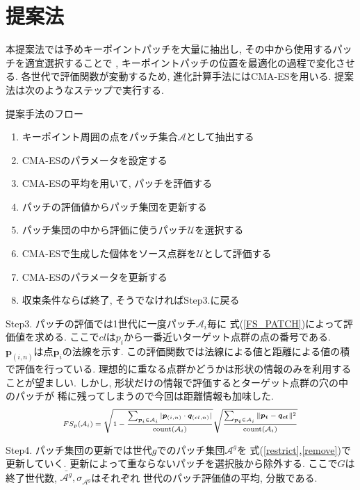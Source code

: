 \documentclass[twocolumn, 9pt, a4j, dvipdfmx]{jsarticle}
\begin{document}
\section{提案法}
本提案法では予めキーポイントパッチを大量に抽出し, 
その中から使用するパッチを適宜選択することで , 
キーポイントパッチの位置を最適化の過程で変化させる.
各世代で評価関数が変動するため, 進化計算手法にはCMA-ES\cite{CMA-ES}を用いる. 
提案法は次のようなステップで実行する. 
\begin{itembox}[l]{提案手法のフロー}
\vspace{-2mm}
\begin{enumerate}[Step1.]
    \item キーポイント周囲の点をパッチ集合$\mathcal{A}$として抽出する
    \item CMA-ESのパラメータを設定する
    \item CMA-ESの平均を用いて, パッチを評価する 
    \item パッチの評価値からパッチ集団を更新する 
    \item パッチ集団の中から評価に使うパッチ$\mathcal{U}$を選択する 
    \item CMA-ESで生成した個体をソース点群を$\mathcal{U}$として評価する
    \item CMA-ESのパラメータを更新する 
    \item 収束条件ならば終了, そうでなければStep3.に戻る
\end{enumerate}
\vspace{-2mm}
\end{itembox}
Step3. パッチの評価では1世代に一度パッチ$\mathcal{A}_i$毎に
式(\ref{FS_PATCH})によって評価値を求める. 
ここで$cl$は$p_i$から一番近いターゲット点群の点の番号である. 
$\bm{p}_{(i,n)}$は点$\bm{p}_i$の法線を示す. 
この評価関数では法線による値と距離による値の積で評価を行っている. 
理想的に重なる点群かどうかは形状の情報のみを利用することが望ましい. 
しかし, 形状だけの情報で評価するとターゲット点群の穴の中のパッチが
稀に残ってしまうので今回は距離情報も加味した.
\begin{align}
    \label{FS_PATCH}
    \small
    FS_{p}(\mathcal{A}_i) = 
    \scriptsize
    \sqrt{1 -  
        \frac
        {\sum_{\bm{p}_i \in \mathcal{A}_i}|\bm{p}_{(i,n)} \cdot \bm{q}_{(cl,n)}|}
        {\text{count}(\mathcal{A}_i)} 
    } 
    \sqrt{
        \frac
        {\sum_{\bm{p_i}\in\mathcal{A}_i}\|\bm{p_i} - \bm{q_{cl}}\|^2}
        {\text{count}(\mathcal{A}_i)}
    }
\normalsize
\end{align}

Step4. パッチ集団の更新では世代$g$でのパッチ集団$\mathcal{A}^g$を
式(\ref{restrict},\ref{remove})で更新していく. 
更新によって重ならないパッチを選択肢から除外する. 
ここで$G$は終了世代数, $\bar{\mathcal{A}^g}, \sigma_{\mathcal{A}^g}$はそれぞれ
世代のパッチ評価値の平均, 分散である. 
\end{document}
